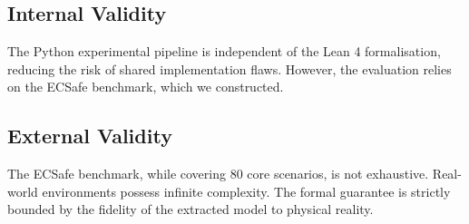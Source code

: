 \subsection{Internal Validity}
The Python experimental pipeline is independent of the Lean 4 formalisation, reducing the risk of shared implementation flaws. However, the evaluation relies on the ECSafe benchmark, which we constructed.

\subsection{External Validity}
The ECSafe benchmark, while covering 80 core scenarios, is not exhaustive. Real-world environments possess infinite complexity. The formal guarantee is strictly bounded by the fidelity of the extracted model to physical reality.
